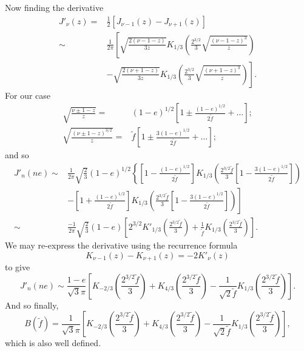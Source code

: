 \documentclass[a4paper, 11pt, titlepage, twoside]{report}
\newcommand{\recip}[1]{\ensuremath{\frac{1}{#1}}}
\begin{document}
{Now finding the derivative
\begin{align}
J'_\nu(z) = {} & \recip{2}\left[J_{\nu-1}(z) - J_{\nu+1}(z)\right] \nonumber \\
 \sim {} & \recip{2\pi}\left[\sqrt{\frac{2(\nu -1 - z)}{3z}}K_{1/3}\left(\frac{2^{3/2}}{3}\sqrt{\frac{(\nu - 1 - z)^3}{z}}\right) \right. \nonumber \\
  & \left. - \sqrt{\frac{2(\nu +1 - z)}{3z}}K_{1/3}\left(\frac{2^{3/2}}{3}\sqrt{\frac{(\nu + 1 - z)^3}{z}}\right)\right].
\end{align}
For our case
\begin{align}
\sqrt{\frac{\nu \pm 1 - z}{z}} = {} & (1 - e)^{1/2}\left[1 \pm \frac{(1-e)^{1/2}}{2\widetilde{f}} + \ldots\right];\\
\sqrt{\frac{(\nu \pm 1 - z)^{3/2}}{z}} = {} & \widetilde{f}\left[1 \pm \frac{3(1-e)^{1/2}}{2\widetilde{f}} + \ldots\right];
\end{align}
and so
\begin{align}
J'_n(ne) \sim {} & \recip{2\pi}\sqrt{\frac{2}{3}}(1-e)^{1/2}\left\{\left[1 - \frac{(1-e)^{1/2}}{2\widetilde{f}}\right]K_{1/3}\left(\frac{2^{3/2}\widetilde{f}}{3}\left[1 - \frac{3(1-e)^{1/2}}{2\widetilde{f}}\right]\right) \right. \nonumber \\
 & \left. - \left[1 + \frac{(1-e)^{1/2}}{2\widetilde{f}}\right]K_{1/3}\left(\frac{2^{3/2}\widetilde{f}}{3}\left[1 - \frac{3(1-e)^{1/2}}{2\widetilde{f}}\right]\right)\right]\nonumber \\
 \sim {} & \frac{-1}{2\pi}\sqrt{\frac{2}{3}}(1-e)\left[2^{3/2}K'_{1/3}\left(\frac{2^{3/2}\widetilde{f}}{3}\right) + \recip{\widetilde{f}}K_{1/3}\left(\frac{2^{3/2}\widetilde{f}}{3}\right)\right].
\end{align}
We may re-express the derivative using the recurrence formula\cite{Watson1995}
\begin{equation}
K_{\nu-1}(z) - K_{\nu+1}(z) = -2K'_\nu(z)
\end{equation}
to give
\begin{equation}
J'_n(ne) \sim \frac{1-e}{\sqrt{3}\pi}\left[K_{-2/3}\left(\frac{2^{3/2}\widetilde{f}}{3}\right) + K_{4/3}\left(\frac{2^{3/2}\widetilde{f}}{3}\right) - \recip{\sqrt{2}\widetilde{f}}K_{1/3}\left(\frac{2^{3/2}\widetilde{f}}{3}\right)\right].
\end{equation}
And so finally,
\begin{equation}
B(\widetilde{f}) = \recip{\sqrt{3}\pi}\left[K_{-2/3}\left(\frac{2^{3/2}\widetilde{f}}{3}\right) + K_{4/3}\left(\frac{2^{3/2}\widetilde{f}}{3}\right) - \recip{\sqrt{2}\widetilde{f}}K_{1/3}\left(\frac{2^{3/2}\widetilde{f}}{3}\right)\right],
\end{equation}
which is also well defined.

}
\end{document}

